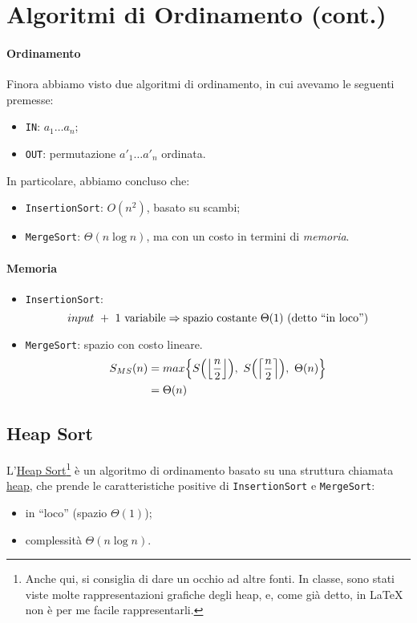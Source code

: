 \section{Algoritmi di Ordinamento (cont.)}
\paragraph{Ordinamento} Finora abbiamo visto due algoritmi di ordinamento, in cui avevamo le seguenti 
premesse:
\begin{itemize}
	\item[] \texttt{IN}: $a_1\dots a_n$;
	\item[] \texttt{OUT}: permutazione $a'_1\dots a'_n$ ordinata.
\end{itemize}
In particolare, abbiamo concluso che:
\begin{itemize}
	\item \texttt{InsertionSort}: $O(n^2)$, basato su scambi;
	\item \texttt{MergeSort}: $\Theta(n \log n)$, ma con un costo in termini di \emph{memoria}.
\end{itemize}

\paragraph{Memoria} 
\begin{itemize}
	\item \texttt{InsertionSort}: 
	$$input \ + \ 1 \text{ variabile} \Rightarrow 
		\text{spazio \emph{costante} } \Theta (1) \text{ (detto ``in loco'')}$$
	\item \texttt{MergeSort}: spazio con costo lineare.
	\begin{align*}
		S_{MS}(n) & = max\Big{\{} S\Big( \Big{\lfloor}{\frac{n}{2}}\Big{\rfloor} \Big), 
		\ S\Big( \Big{\lceil}{\frac{n}{2}}\Big{\rceil} \Big), \ \Theta (n) \Big{\}} \\
		& = \Theta (n)
	\end{align*}
\end{itemize}

\subsection{Heap Sort} \label{heapsort} 
L'\href{https://en.wikipedia.org/wiki/Heapsort}{Heap Sort}\footnote{Anche qui, si consiglia di dare %
un occhio ad altre fonti. In classe, sono stati viste molte rappresentazioni grafiche degli heap, %
e, come già detto, in \LaTeX $\ $non è per me facile rappresentarli.} è un algoritmo di ordinamento 
basato su 
una struttura chiamata \href{https://en.wikipedia.org/wiki/Heap_(data_structure)}{heap}, che prende le caratteristiche positive di 
\texttt{InsertionSort} e \texttt{MergeSort}:
\begin{itemize}[noitemsep]
	\item in ``loco'' (spazio $\Theta (1)$);
	\item complessità $\Theta(n \log n)$.
\end{itemize}

